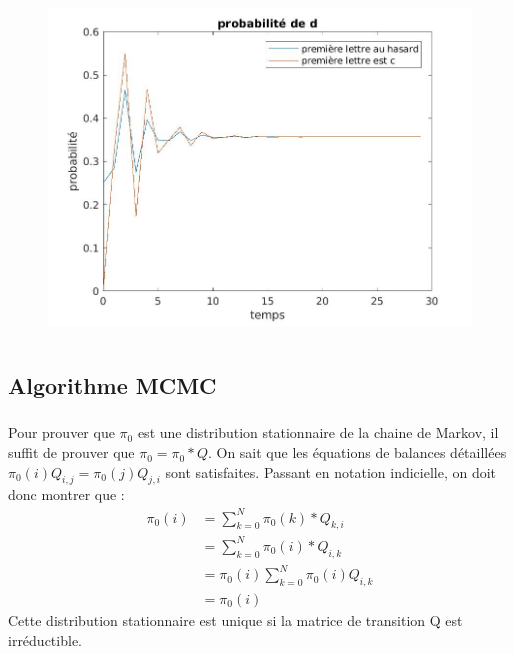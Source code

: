 \documentclass[11pt]{report}
\begin{document}
\begin{figure}[!h]
\begin{center}
\includegraphics[height = 9cm]{prob_d.jpg}
\caption{\label{prob_d}}
\end{center}
\end{figure}
\subsubsection{}
\subsubsection{}
\subsubsection{}
\subsection{Algorithme MCMC}
\subsubsection{}
Pour prouver que $\pi_0$ est une distribution stationnaire de la chaine de Markov, il suffit de prouver que $\pi_0=\pi_0 *Q$. 
On sait que les équations de balances détaillées $\pi_0(i)Q_{i,j} = \pi_0(j)Q_{j,i}$ sont satisfaites.
Passant en notation indicielle, on doit donc montrer que :
\begin{align*}
\pi_0(i) &= \sum^{N}_{k=0} \pi_0(k)*Q_{k,i} \\
& = \sum^{N}_{k=0} \pi_0(i)*Q_{i,k} \\
& = \pi_0(i) \sum^{N}_{k=0} \pi_0(i) Q_{i,k} \\
& = \pi_0(i)
\end{align*}
Cette distribution stationnaire est unique si la matrice de transition Q est irréductible.
\end{document}
